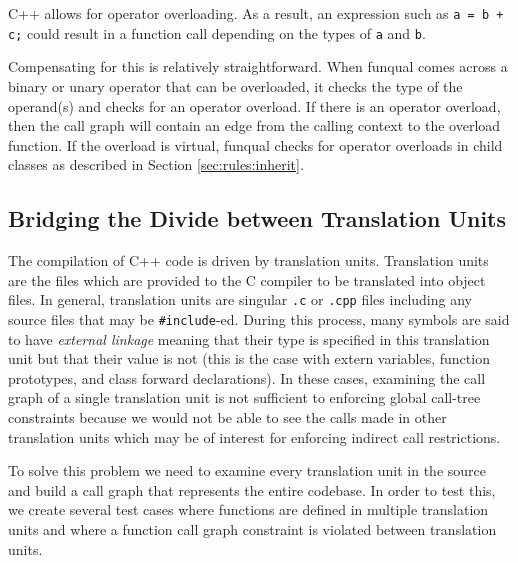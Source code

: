 C++ allows for operator overloading.  As a result, an expression such as \mbox{\lstinline{a = b + c;}} could result in a function call depending on the types of \lstinline{a} and \lstinline{b}.  

Compensating for this is relatively straightforward.  When funqual comes across a binary or unary operator that can be overloaded, it checks the type of the operand(s) and checks for an operator overload.  If there is an operator overload, then the call graph will contain an edge from the calling context to the overload function.  If the overload is virtual, funqual checks for operator overloads in child classes as described in Section \ref{sec:rules:inherit}.

\subsection{Bridging the Divide between Translation Units}

The compilation of C++ code is driven by translation units.  Translation units are the files which are provided to the C compiler to be translated into object files.  In general, translation units are singular \lstinline{.c} or \lstinline{.cpp} files including any source files that may be \lstinline{#include}-ed.  During this process, many symbols are said to have \textit{external linkage} meaning that their type is specified in this translation unit but that their value is not (this is the case with extern variables, function prototypes, and class forward declarations).  In these cases, examining the call graph of a single translation unit is not sufficient to enforcing global call-tree constraints because we would not be able to see the calls made in other translation units which may be of interest for enforcing indirect call restrictions.  

To solve this problem we need to examine every translation unit in the source and build a call graph that represents the entire codebase.  In order to test this, we create several test cases where functions are defined in multiple translation units and where a function call graph constraint is violated between translation units.
